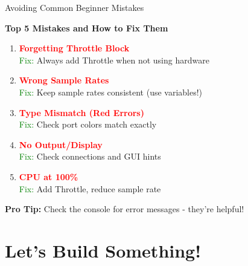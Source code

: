 \documentclass[aspectratio=169,11pt]{beamer}
\begin{document}
\begin{frame}{Avoiding Common Beginner Mistakes}
\begin{center}
\Large\textbf{Top 5 Mistakes and How to Fix Them}
\end{center}
\vspace{0.5em}
\begin{enumerate}
    \item \textbf{\textcolor{red}{Forgetting Throttle Block}}\\
    \textcolor{green}{Fix:} Always add Throttle when not using hardware\\[0.5em]
    
    \item \textbf{\textcolor{red}{Wrong Sample Rates}}\\
    \textcolor{green}{Fix:} Keep sample rates consistent (use variables!)\\[0.5em]
    
    \item \textbf{\textcolor{red}{Type Mismatch (Red Errors)}}\\
    \textcolor{green}{Fix:} Check port colors match exactly\\[0.5em]
    
    \item \textbf{\textcolor{red}{No Output/Display}}\\
    \textcolor{green}{Fix:} Check connections and GUI hints\\[0.5em]
    
    \item \textbf{\textcolor{red}{CPU at 100\%}}\\
    \textcolor{green}{Fix:} Add Throttle, reduce sample rate
\end{enumerate}
\vspace{0.5em}
\begin{center}\colorbox{yellow!20}{\parbox{0.9\textwidth}{
\textbf{Pro Tip:} Check the console for error messages - they're helpful!
}}\end{center}
\end{frame}


\section{Let's Build Something!}
\end{document}
